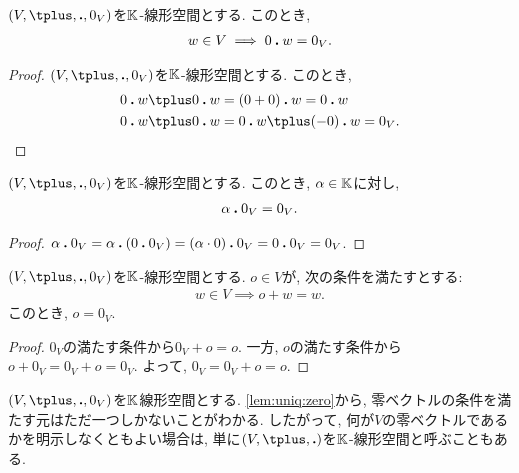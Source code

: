 \begin{prop}
  \label{prop:zeroveciszeroscalar}
  $(V,\plus ,\act ,0_V)$を$\mathbb{K}$-線形空間とする.
  このとき,
  \begin{align*}
    w\in V \implies 0\mathbin{\boldsymbol{.}} w=0_V. 
  \end{align*}
\end{prop}
\begin{proof}
$(V,\plus,\act,0_V)$を$\mathbb{K}$-線形空間とする.
  このとき,
  \begin{align*}
    0\act w\plus 0\act w&=(0+0)\act w=0\act w\\
    0\act w\plus 0\act w&=0\act w\plus (-0)\act w=0_V.
  \end{align*}
\end{proof}
\begin{prop}
$(V,\plus ,\act ,0_V)$を$\mathbb{K}$-線形空間とする.
このとき, $\alpha \in\mathbb{K}$に対し,
\begin{align*}
\alpha \mathbin{\boldsymbol{.}} 0_V = 0_V.
\end{align*}
\end{prop}
\begin{proof}
$\alpha \mathbin{\boldsymbol{.}} 0_V = \alpha \mathbin{\boldsymbol{.}} (0\mathbin{\boldsymbol{.}} 0_V)= (\alpha \cdot 0)\mathbin{\boldsymbol{.}} 0_V=0\mathbin{\boldsymbol{.}} 0_V=0_V$.
\end{proof}


\begin{prop}
  \label{lem:uniq:zero}
  $(V,\plus ,\act ,0_V)$を$\mathbb{K}$-線形空間とする.
  $o\in V$が, 次の条件を満たすとする:
  \begin{align*}
    w\in V \implies o\plus w=w.
  \end{align*}
  このとき, $o=0_V$.
\end{prop}
\begin{proof}
  $0_V$の満たす条件から$0_V\plus o=o$.
  一方, $o$の満たす条件から$o\plus 0_V=0_V\plus o=0_V$.
  よって, $0_V=0_V\plus o=o$.
\end{proof}
\begin{remark}
\label{rem:altdef:1}
  $(V,\plus,\act,0_V)$を$\mathbb{K}$線形空間とする.
  \cref{lem:uniq:zero}から,
  零ベクトルの条件を満たす元はただ一つしかないことがわかる.
  したがって, 
  何が$V$の零ベクトルであるかを明示しなくともよい場合は,
  単に$(V,\plus ,\act)$を$\mathbb{K}$-線形空間と呼ぶこともある.
\end{remark}

